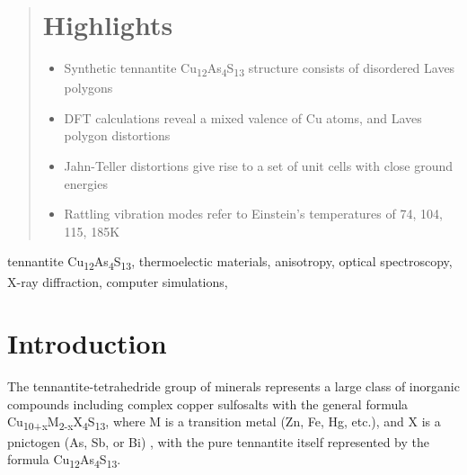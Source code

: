 \documentclass[preprint,review,12pt]{elsarticle}
\begin{document}
\begin{frontmatter}
\begin{abstract}
\section*{Highlights}
\begin{itemize}
  \item Synthetic tennantite Cu\textsubscript{12}As\textsubscript{4}S\textsubscript{13} structure consists of disordered Laves polygons
  \item DFT calculations reveal a mixed valence of Cu atoms, and Laves polygon distortions
  \item Jahn-Teller distortions give rise to a set of unit cells with close ground energies
  \item Rattling vibration modes refer to Einstein’s temperatures of 74, 104, 115, 185K
\end{itemize}

\end{abstract}

\begin{keyword}
tennantite Cu\textsubscript{12}As\textsubscript{4}S\textsubscript{13}\sep
thermoelectic materials\sep
anisotropy\sep
optical spectroscopy\sep
X-ray diffraction\sep
computer simulations\sep



\end{keyword}

\end{frontmatter}


\section{Introduction}\label{sec:level1}

The tennantite-tetrahedride group of minerals represents a large class of inorganic compounds including complex copper sulfosalts with the general formula Cu\textsubscript{10+x}M\textsubscript{2-x}X\textsubscript{4}S\textsubscript{13}, where M is a transition metal (Zn, Fe, Hg, etc.), and X is a pnictogen (As, Sb, or Bi) \cite{Makovicky_2006}, with the pure tennantite itself represented by the formula Cu\textsubscript{12}As\textsubscript{4}S\textsubscript{13}.
\end{document}
